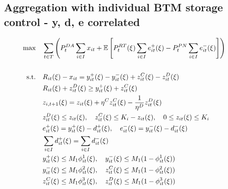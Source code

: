 \documentclass[10pt]{article}
\begin{document}
\subsection{Aggregation with individual BTM storage control - y, d, e correlated}
\begin{subequations}
    \begin{align}
        \text{max} \quad &\sum_{t\in T}\left(P_t^{DA} \sum_{i \in I}x_{it} + \mathbb{E}\left[P_t^{RT}(\xi)\sum_{i \in I}e^+_{it}(\xi) - P_t^{PN}\sum_{i \in I}e^-_{it}(\xi)\right]\right)&\\ 
        &&\notag\\   
        \text{s.t.} \quad &R_{it}(\xi) - x_{it} = y_{it}^{+}(\xi) - y_{it}^{-}(\xi) + z^C_{it}(\xi) - z^D_{it}(\xi)&\\
        &R_{it}(\xi) + z^D_{it}(\xi) \geq y^+_{it}(\xi) +  z^C_{it}(\xi) &\\
        &z_{i,t+1}(\xi) = z_{it}(\xi) + \eta^C z^C_{it}(\xi) - \frac{1}{\eta^D}z^D_{it}(\xi)&\\
        &z^D_{it}(\xi) \le z_{it}(\xi), \quad z^C_{it}(\xi) \le K_i-z_{it}(\xi), \quad 0 \leq z_{it}(\xi) \leq K_i &\\
        &e^+_{it}(\xi) = y^+_{it}(\xi) - d^+_{it}(\xi), \quad e^-_{it}(\xi) = y^-_{it}(\xi) - d^-_{it}(\xi)&\\
        &\sum_{i \in I} d^+_{it}(\xi) = \sum_{i \in I} d^-_{it}(\xi)&\\
        &y^+_{it}(\xi) \leq M_1 \phi^1_{it}(\xi), \quad y^-_{it}(\xi) \leq M_1 (1 - \phi^1_{it}(\xi)) &\\
        &y^-_{it}(\xi) \leq M_1 \phi^2_{it}(\xi), \quad z^C_{it}(\xi) \leq M_1 (1 - \phi^2_{it}(\xi)) &\\
        &z^C_{it}(\xi) \leq M_1 \phi^3_{it}(\xi), \quad z^D_{it}(\xi) \leq M_1 (1 - \phi^3_{it}(\xi)) &
    \end{align}
\end{subequations}
\end{document}
